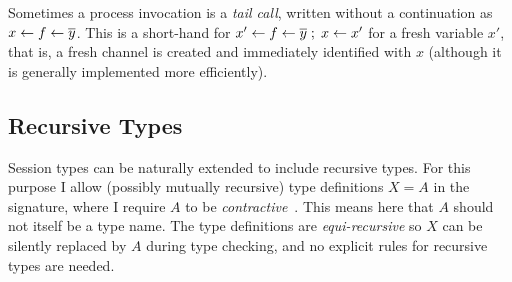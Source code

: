 Sometimes a process invocation is a \emph{tail call}, written without
a continuation as $\procdef{f}{\overline{y}}{x}$. This is a
short-hand for
$\procdef{f}{\overline{y}}{x'} \semi \fwd{x}{x'}$ for a
fresh variable $x'$, that is, a fresh channel is created and
immediately identified with $x$ (although it is generally implemented
more efficiently).

\subsection*{Recursive Types}
Session types can be naturally extended to include recursive types.
For this purpose I allow (possibly mutually recursive) type
definitions $X = A$ in the signature, where I require $A$ to be
\emph{contractive}~\cite{Gay05acta}.  This means here that $A$ should
not itself be a type name. The type definitions are
\emph{equi-recursive} so $X$ can be silently replaced by $A$ during
type checking, and no explicit rules for recursive types are needed.

